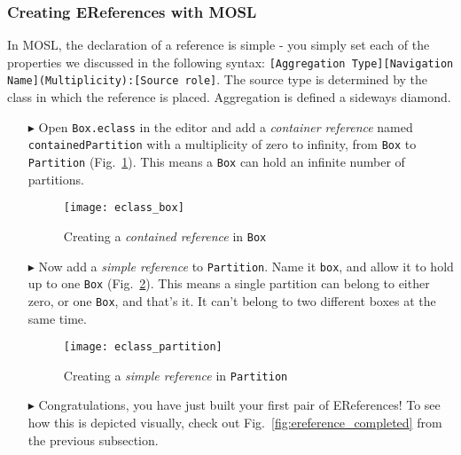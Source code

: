 \newpage
\subsubsection{Creating EReferences with MOSL}
\texHeader
\hypertarget{static:references tex}{}

In MOSL, the declaration of a reference is simple - you simply set each of the properties we discussed in the following syntax: {\small{\texttt{[Aggregation
Type][Navigation Name](Multiplicity):[Source role]}}}. The source type is determined by the class in which the reference is placed. Aggregation
is defined a sideways diamond.

\begin{itemize}

\item[$\blacktriangleright$] Open \texttt{Box.eclass} in the editor and add a \emph{container reference} named \texttt{containedPartition} with a
multiplicity of zero to infinity, from \texttt{Box} to \texttt{Partition} (Fig.~\ref{fig:cpartitionReference}). This means a \texttt{Box} can hold an
infinite number of partitions.

\begin{figure}[htbp]
	\centering
  \texttt{[image: eclass\_box]}
	\caption{Creating a \emph{contained reference} in \texttt{Box}}
	\label{fig:cpartitionReference}
\end{figure} 

\item[$\blacktriangleright$] Now add a \emph{simple reference} to \texttt{Partition}. Name it \texttt{box}, and allow it to hold up to one \texttt{Box}
(Fig.~\ref{fig:boxReference}). This means a single partition can belong to either zero, or one \texttt{Box}, and that's it. It can't belong to two different
boxes at the same time.

\begin{figure}[htbp]
	\centering
  \texttt{[image: eclass\_partition]}
	\caption{Creating a \emph{simple reference} in \texttt{Partition}}
	\label{fig:boxReference}
\end{figure} 

\item[$\blacktriangleright$] Congratulations, you have just built your first pair of EReferences! To see how this is depicted visually, check out
Fig.~\ref{fig:ereference_completed} from the previous subsection.

\newpage


\end{itemize}
